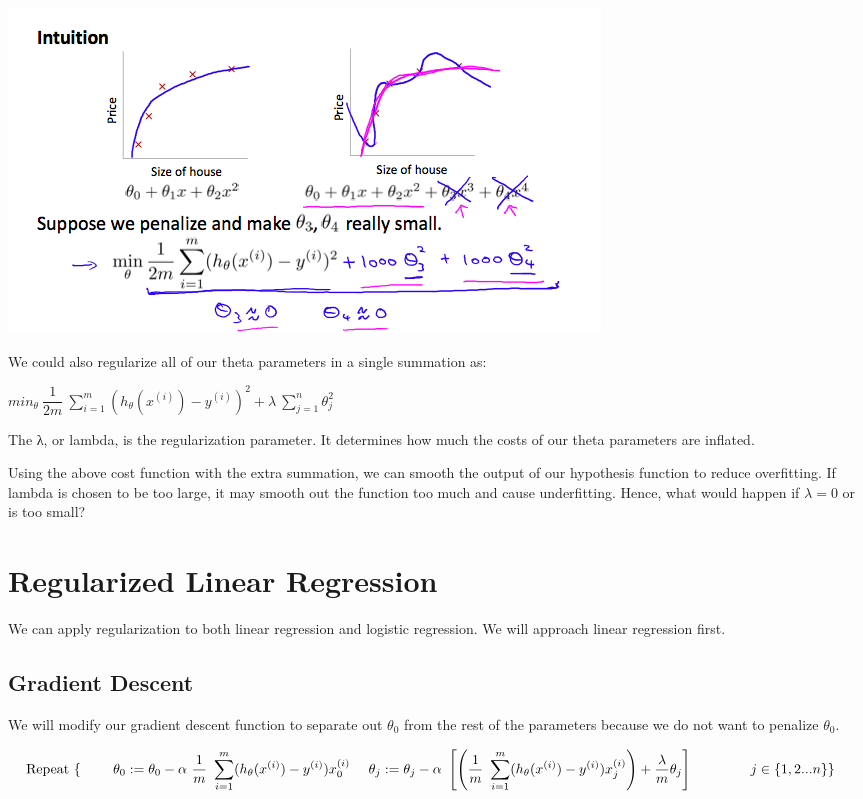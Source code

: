 \documentclass[
]{book}
\begin{document}
\includegraphics{RegCostFunc.png}

We could also regularize all of our theta parameters in a single summation as:

\(min_\theta\ \dfrac{1}{2m}\ \sum_{i=1}^m (h_\theta(x^{(i)}) - y^{(i)})^2 + \lambda\ \sum_{j=1}^n \theta_j^2\)

The λ, or lambda, is the regularization parameter. It determines how much the costs of our theta parameters are inflated.

Using the above cost function with the extra summation, we can smooth the output of our hypothesis function to reduce overfitting. If lambda is chosen to be too large, it may smooth out the function too much and cause underfitting. Hence, what would happen if \(\lambda = 0\) or is too small?

\hypertarget{regularized-linear-regression}{%
\section{Regularized Linear Regression}\label{regularized-linear-regression}}

We can apply regularization to both linear regression and logistic regression. We will approach linear regression first.

\hypertarget{gradient-descent-1}{%
\subsection{Gradient Descent}\label{gradient-descent-1}}

We will modify our gradient descent function to separate out \(\theta_0\) from the rest of the parameters because we do not want to penalize \(\theta_0\).

\begin{align} & \text{Repeat}\ \lbrace \newline & \ \ \ \ \theta_0 := \theta_0 - \alpha\ \frac{1}{m}\ \sum_{i=1}^m (h_\theta(x^{(i)}) - y^{(i)})x_0^{(i)} \newline & \ \ \ \ \theta_j := \theta_j - \alpha\ \left[ \left( \frac{1}{m}\ \sum_{i=1}^m (h_\theta(x^{(i)}) - y^{(i)})x_j^{(i)} \right) + \frac{\lambda}{m}\theta_j \right] &\ \ \ \ \ \ \ \ \ \ j \in \lbrace 1,2...n\rbrace\newline & \rbrace \end{align}
\end{document}
